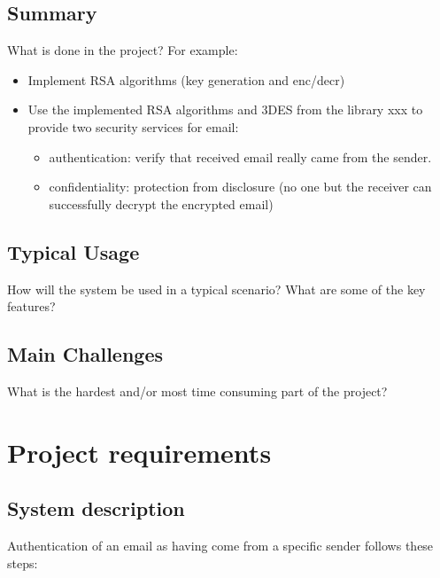 \documentclass[12pt, a4paper]{report}
\begin{document}
\section{Summary}
\label{sec:summary}
What is done in the project?  For example:

\begin{itemize}
	\item Implement RSA algorithms (key generation and enc/decr)
	
	\item Use the implemented RSA algorithms and 3DES from the library xxx to provide two security services for email:
	
			\begin{itemize}
				\item authentication: verify that received email really came from the sender.
				
				\item confidentiality: protection from disclosure (no one but the receiver can successfully decrypt the encrypted email) 
			\end{itemize}
\end{itemize}




\section{Typical Usage}
\label{sec:usage}

How will the system be used in a typical scenario? What are some of the key features? 


\section{Main Challenges}
\label{sec:challenges}

What is  the hardest and/or most time consuming part of the project? 

\chapter{Project requirements}


\section{System description}

Authentication of an email as having come from a specific sender follows these steps:
\end{document}
